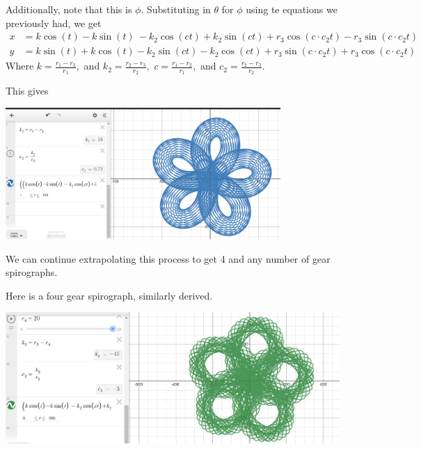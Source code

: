 \documentclass{article}
\begin{document}
Additionally, note that this is $\phi.$ Substituting in $\theta$ for $\phi$ using te equations we previously had, we get
\[
\begin{aligned}
    x &= k\cos\left(t\right)-k\sin\left(t\right)\ -k_{2}\cos\left(ct\right)+k_{2}\sin\left(ct\right) + r_{3}\cos\left(c \cdot c_{2}t\right)-r_{3}\sin\left(c \cdot c_{2}t\right) \\
    y &= k\sin\left(t\right)+k\cos\left(t\right) -k_{2}\sin\left(ct\right)-k_{2}\cos\left(ct\right)+r_{3}\sin\left(c \cdot c_{2}t\right)+r_{3}\cos\left(c\cdot c_{2}t\right)
\end{aligned}
\]
Where $k = \frac{r_1 - r_2}{r_1},$ and $k_2 = \frac{r_2 - r_3}{r_2},$ $c = \frac{r_1 - r_2}{r_1},$ and $c_2 = \frac{r_2 - r_3}{r_2}$.

This gives

\begin{center}
\includegraphics[height=5cm]{images/3-Gear Spiro.png}
\end{center}

We can continue extrapolating this process to get 4 and any number of gear spirographs. 

Here is a four gear spirograph, similarly derived.

\begin{center}
\includegraphics[height=5cm]{images/4 Gear Spiro.png}
\end{center}
\end{document}
